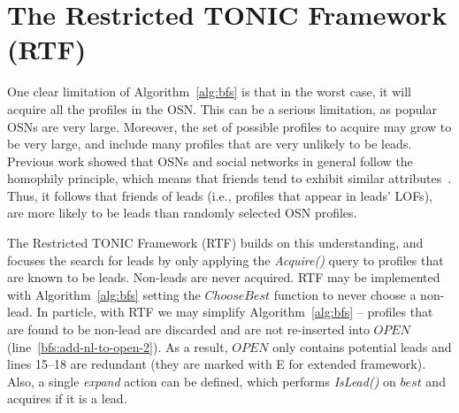 \documentclass[journal]{IEEEtran}
\newcommand{\islead}[1]{{\em IsLead(#1)}}
\newcommand{\acquire}[1]{{\em Acquire(#1)}}
\begin{document}


\section{The Restricted TONIC Framework (RTF)}
\label{sec:rtf}

One clear limitation of Algorithm~\ref{alg:bfs} is that in the worst case, it will acquire all the profiles in the OSN. This can be a serious limitation, as popular OSNs are very large. Moreover, the set of possible profiles to acquire may grow to be very large, and include many profiles that are very unlikely to be leads. Previous work showed that OSNs and social networks in general follow the homophily principle, which means that friends tend to exhibit similar attributes~\cite{mcpherson2001birds,altshuler2012security,fire2012predictingStudent}. Thus, it follows that friends of leads (i.e., profiles that appear in leads' LOFs), are more likely to be leads than randomly selected OSN profiles. 

The Restricted TONIC Framework (RTF) builds on this understanding, and focuses the search for leads by only applying the \acquire{} query to profiles that are known to be leads. Non-leads are never acquired. 
RTF may be implemented with Algorithm~\ref{alg:bfs} setting the $ChooseBest$ function to never choose a non-lead. In particle, with RTF we may simplify Algorithm~\ref{alg:bfs} --  profiles that are found to be non-lead are discarded and are not re-inserted into $OPEN$ (line~\ref{bfs:add-nl-to-open-2}). As a result, $OPEN$ only contains potential leads and lines 15--18 are redundant (they are marked with E for extended framework). 
Also, a single {\em expand} action can be defined, which performs \islead{} on $best$ and acquires if it is a lead. %
\end{document}
